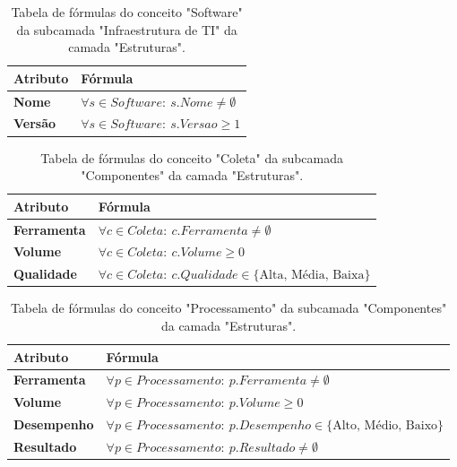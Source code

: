 \begin{apendicesenv}
\begin{table}[H]
\centering
\caption{Tabela de fórmulas do conceito "Software" da subcamada "Infraestrutura de TI" da camada "Estruturas".}
\begin{tabularx}{\textwidth}{|l|X|}
\hline
\textbf{Atributo} & \textbf{Fórmula} \\ \hline
\textbf{Nome} & $\forall s \in Software:\ s.Nome \neq \emptyset$ \\ \hline
\textbf{Versão} & $\forall s \in Software:\ s.Versao \ge 1$ \\ \hline
\end{tabularx}
\end{table}

\begin{table}[H]
\centering
\caption{Tabela de fórmulas do conceito "Coleta" da subcamada "Componentes" da camada "Estruturas".}
\begin{tabularx}{\textwidth}{|l|X|}
\hline
\textbf{Atributo} & \textbf{Fórmula} \\ \hline
\textbf{Ferramenta} & $\forall c \in Coleta:\ c.Ferramenta \neq \emptyset$ \\ \hline
\textbf{Volume} & $\forall c \in Coleta:\ c.Volume \ge 0$ \\ \hline
\textbf{Qualidade} & $\forall c \in Coleta:\ c.Qualidade \in \{\text{Alta, Média, Baixa}\}$ \\ \hline
\end{tabularx}
\end{table}

\begin{table}[H]
\centering
\caption{Tabela de fórmulas do conceito "Processamento" da subcamada "Componentes" da camada "Estruturas".}
\begin{tabularx}{\textwidth}{|l|X|}
\hline
\textbf{Atributo} & \textbf{Fórmula} \\ \hline
\textbf{Ferramenta} & $\forall p \in Processamento:\ p.Ferramenta \neq \emptyset$ \\ \hline
\textbf{Volume} & $\forall p \in Processamento:\ p.Volume \ge 0$ \\ \hline
\textbf{Desempenho} & $\forall p \in Processamento:\ p.Desempenho \in \{\text{Alto, Médio, Baixo}\}$ \\ \hline
\textbf{Resultado} & $\forall p \in Processamento:\ p.Resultado \neq \emptyset$ \\ \hline
\end{tabularx}
\end{table}


\end{apendicesenv}
